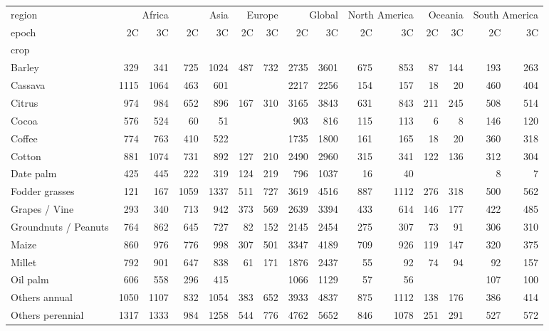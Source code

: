 \begin{tabular}{lrrrrrrrrrrrrrr}
\toprule
region & \multicolumn{2}{r}{Africa} & \multicolumn{2}{r}{Asia} & \multicolumn{2}{r}{Europe} & \multicolumn{2}{r}{Global} & \multicolumn{2}{r}{North America} & \multicolumn{2}{r}{Oceania} & \multicolumn{2}{r}{South America} \\
epoch & 2C & 3C & 2C & 3C & 2C & 3C & 2C & 3C & 2C & 3C & 2C & 3C & 2C & 3C \\
crop &  &  &  &  &  &  &  &  &  &  &  &  &  &  \\
\midrule
Barley & 329 & 341 & 725 & 1024 & 487 & 732 & 2735 & 3601 & 675 & 853 & 87 & 144 & 193 & 263 \\
Cassava & 1115 & 1064 & 463 & 601 &  &  & 2217 & 2256 & 154 & 157 & 18 & 20 & 460 & 404 \\
Citrus & 974 & 984 & 652 & 896 & 167 & 310 & 3165 & 3843 & 631 & 843 & 211 & 245 & 508 & 514 \\
Cocoa & 576 & 524 & 60 & 51 &  &  & 903 & 816 & 115 & 113 & 6 & 8 & 146 & 120 \\
Coffee & 774 & 763 & 410 & 522 &  &  & 1735 & 1800 & 161 & 165 & 18 & 20 & 360 & 318 \\
Cotton & 881 & 1074 & 731 & 892 & 127 & 210 & 2490 & 2960 & 315 & 341 & 122 & 136 & 312 & 304 \\
Date palm & 425 & 445 & 222 & 319 & 124 & 219 & 796 & 1037 & 16 & 40 &  &  & 8 & 7 \\
Fodder grasses & 121 & 167 & 1059 & 1337 & 511 & 727 & 3619 & 4516 & 887 & 1112 & 276 & 318 & 500 & 562 \\
Grapes / Vine & 293 & 340 & 713 & 942 & 373 & 569 & 2639 & 3394 & 433 & 614 & 146 & 177 & 422 & 485 \\
Groundnuts / Peanuts & 764 & 862 & 645 & 727 & 82 & 152 & 2145 & 2454 & 275 & 307 & 73 & 91 & 306 & 310 \\
Maize & 860 & 976 & 776 & 998 & 307 & 501 & 3347 & 4189 & 709 & 926 & 119 & 147 & 320 & 375 \\
Millet & 792 & 901 & 647 & 838 & 61 & 171 & 1876 & 2437 & 55 & 92 & 74 & 94 & 92 & 157 \\
Oil palm & 606 & 558 & 296 & 415 &  &  & 1066 & 1129 & 57 & 56 &  &  & 107 & 100 \\
Others annual & 1050 & 1107 & 832 & 1054 & 383 & 652 & 3933 & 4837 & 875 & 1112 & 138 & 176 & 386 & 414 \\
Others perennial & 1317 & 1333 & 984 & 1258 & 544 & 776 & 4762 & 5652 & 846 & 1078 & 251 & 291 & 527 & 572 \\

\end{tabular}
